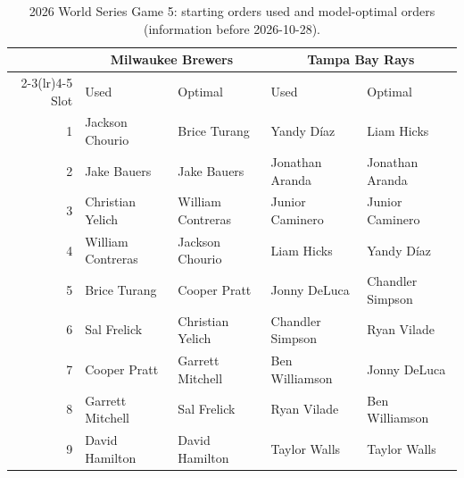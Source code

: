 \begin{table}[t]\centering\small
\caption{2026 World Series Game 5: starting orders used and model-optimal orders (information before 2026-10-28).}\label{tab:ref}
\begin{tabular}{rllll}\toprule
 & \multicolumn{2}{c}{Milwaukee Brewers} & \multicolumn{2}{c}{Tampa Bay Rays}\\
\cmidrule(lr){2-3}\cmidrule(lr){4-5}
Slot & Used & Optimal & Used & Optimal\\ \midrule
1 & Jackson Chourio & Brice Turang & Yandy Díaz & Liam Hicks \\
2 & Jake Bauers & Jake Bauers & Jonathan Aranda & Jonathan Aranda \\
3 & Christian Yelich & William Contreras & Junior Caminero & Junior Caminero \\
4 & William Contreras & Jackson Chourio & Liam Hicks & Yandy Díaz \\
5 & Brice Turang & Cooper Pratt & Jonny DeLuca & Chandler Simpson \\
6 & Sal Frelick & Christian Yelich & Chandler Simpson & Ryan Vilade \\
7 & Cooper Pratt & Garrett Mitchell & Ben Williamson & Jonny DeLuca \\
8 & Garrett Mitchell & Sal Frelick & Ryan Vilade & Ben Williamson \\
9 & David Hamilton & David Hamilton & Taylor Walls & Taylor Walls \\
\bottomrule\end{tabular}\end{table}
